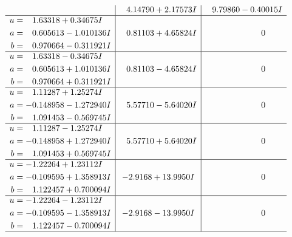 \documentclass[1p]{elsarticle_modified}
\theoremstyle{definition}
\begin{document}
$$\begin{array}{c|c|c}
 & \phantom{-}4.14790 + 2.17573 I & \phantom{-}9.79860 - 0.40015 I \\ \hline\begin{aligned}
u &= \phantom{-}1.63318 + 0.34675 I \\
a &= \phantom{-}0.605613 - 1.010136 I \\
b &= \phantom{-}0.970664 - 0.311921 I\end{aligned}
 & \phantom{-}0.81103 + 4.65824 I & \phantom{-0.000000 } 0 \\ \hline\begin{aligned}
u &= \phantom{-}1.63318 - 0.34675 I \\
a &= \phantom{-}0.605613 + 1.010136 I \\
b &= \phantom{-}0.970664 + 0.311921 I\end{aligned}
 & \phantom{-}0.81103 - 4.65824 I & \phantom{-0.000000 } 0 \\ \hline\begin{aligned}
u &= \phantom{-}1.11287 + 1.25274 I \\
a &= -0.148958 - 1.272940 I \\
b &= \phantom{-}1.091453 - 0.569745 I\end{aligned}
 & \phantom{-}5.57710 - 5.64020 I & \phantom{-0.000000 } 0 \\ \hline\begin{aligned}
u &= \phantom{-}1.11287 - 1.25274 I \\
a &= -0.148958 + 1.272940 I \\
b &= \phantom{-}1.091453 + 0.569745 I\end{aligned}
 & \phantom{-}5.57710 + 5.64020 I & \phantom{-0.000000 } 0 \\ \hline\begin{aligned}
u &= -1.22264 + 1.23112 I \\
a &= -0.109595 + 1.358913 I \\
b &= \phantom{-}1.122457 + 0.700094 I\end{aligned}
 & -2.9168 + 13.9950 I & \phantom{-0.000000 } 0 \\ \hline\begin{aligned}
u &= -1.22264 - 1.23112 I \\
a &= -0.109595 - 1.358913 I \\
b &= \phantom{-}1.122457 - 0.700094 I\end{aligned}
 & -2.9168 - 13.9950 I & \phantom{-0.000000 } 0\\
 \hline 
 \end{array}$$\newpage$$\begin{array}{c|c|c}  

\end{array}$$
\end{document}
